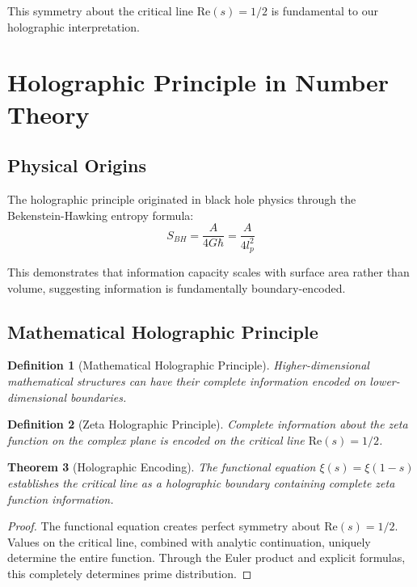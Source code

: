 \documentclass[12pt]{article}
\newtheorem{theorem}{Theorem}[section]
\newtheorem{definition}[theorem]{Definition}
\begin{document}
This symmetry about the critical line $\text{Re}(s) = 1/2$ is fundamental to our holographic interpretation.

\section{Holographic Principle in Number Theory}

\subsection{Physical Origins}

The holographic principle originated in black hole physics through the Bekenstein-Hawking entropy formula:
$$S_{BH} = \frac{A}{4G\hbar} = \frac{A}{4l_p^2}$$

This demonstrates that information capacity scales with surface area rather than volume, suggesting information is fundamentally boundary-encoded.

\subsection{Mathematical Holographic Principle}

\begin{definition}[Mathematical Holographic Principle]
Higher-dimensional mathematical structures can have their complete information encoded on lower-dimensional boundaries.
\end{definition}

\begin{definition}[Zeta Holographic Principle]
Complete information about the zeta function on the complex plane is encoded on the critical line $\text{Re}(s) = 1/2$.
\end{definition}

\begin{theorem}[Holographic Encoding]
The functional equation $\xi(s) = \xi(1-s)$ establishes the critical line as a holographic boundary containing complete zeta function information.
\end{theorem}

\begin{proof}
The functional equation creates perfect symmetry about $\text{Re}(s) = 1/2$. Values on the critical line, combined with analytic continuation, uniquely determine the entire function. Through the Euler product and explicit formulas, this completely determines prime distribution.
\end{proof}
\end{document}
